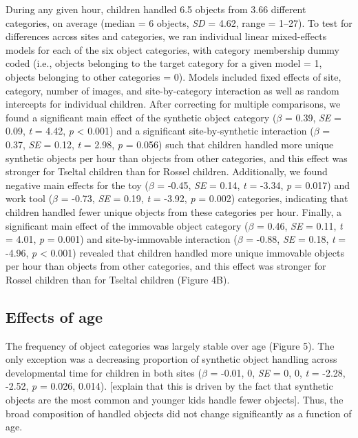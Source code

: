 \documentclass[10pt, letterpaper]{article}
\begin{document}
During any given hour, children handled 6.5 objects from 3.66 different
categories, on average (median = 6 objects, \emph{SD} = 4.62, range =
1--27). To test for differences across sites and categories, we ran
individual linear mixed-effects models for each of the six object
categories, with category membership dummy coded (i.e., objects
belonging to the target category for a given model = 1, objects
belonging to other categories = 0). Models included fixed effects of
site, category, number of images, and site-by-category interaction as
well as random intercepts for individual children. After correcting for
multiple comparisons, we found a significant main effect of the
synthetic object category (\(\beta\) = 0.39, \emph{SE} = 0.09, \emph{t}
= 4.42, \emph{p} \textless{} 0.001) and a significant site-by-synthetic
interaction (\(\beta\) = 0.37, \emph{SE} = 0.12, \emph{t} = 2.98,
\emph{p} = 0.056) such that children handled more unique synthetic
objects per hour than objects from other categories, and this effect was
stronger for Tseltal children than for Rossel children. Additionally, we
found negative main effects for the toy (\(\beta\) = -0.45, \emph{SE} =
0.14, \emph{t} = -3.34, \emph{p} = 0.017) and work tool (\(\beta\) =
-0.73, \emph{SE} = 0.19, \emph{t} = -3.92, \emph{p} = 0.002) categories,
indicating that children handled fewer unique objects from these
categories per hour. Finally, a significant main effect of the immovable
object category (\(\beta\) = 0.46, \emph{SE} = 0.11, \emph{t} = 4.01,
\emph{p} = 0.001) and site-by-immovable interaction (\(\beta\) = -0.88,
\emph{SE} = 0.18, \emph{t} = -4.96, \emph{p} \textless{} 0.001) revealed
that children handled more unique immovable objects per hour than
objects from other categories, and this effect was stronger for Rossel
children than for Tseltal children (Figure 4B).

\hypertarget{effects-of-age}{%
\subsection{Effects of age}\label{effects-of-age}}

The frequency of object categories was largely stable over age (Figure
5). The only exception was a decreasing proportion of synthetic object
handling across developmental time for children in both sites (\(\beta\)
= -0.01, 0, \emph{SE} = 0, 0, \emph{t} = -2.28, -2.52, \emph{p} = 0.026,
0.014). {[}explain that this is driven by the fact that synthetic
objects are the most common and younger kids handle fewer objects{]}.
Thus, the broad composition of handled objects did not change
significantly as a function of age.
\end{document}

